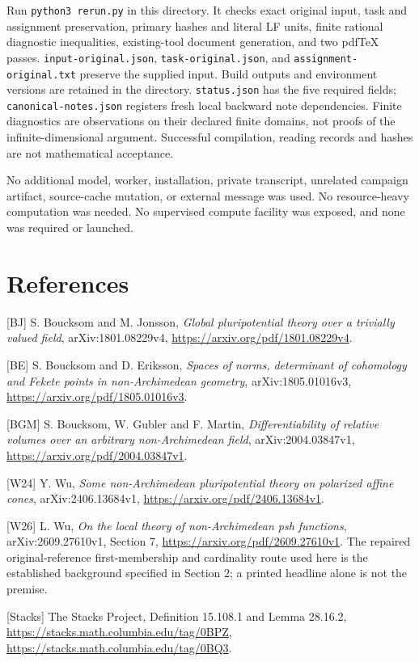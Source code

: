 \documentclass[
  10pt,
]{article}
\begin{document}
Run \texttt{python3\ rerun.py} in this directory. It checks exact
original input, task and assignment preservation, primary hashes and
literal LF units, finite rational diagnostic inequalities, existing-tool
document generation, and two pdfTeX passes.
\texttt{input-original.json}, \texttt{task-original.json}, and
\texttt{assignment-original.txt} preserve the supplied input. Build
outputs and environment versions are retained in the directory.
\texttt{status.json} has the five required fields;
\texttt{canonical-notes.json} registers fresh local backward note
dependencies. Finite diagnostics are observations on their declared
finite domains, not proofs of the infinite-dimensional argument.
Successful compilation, reading records and hashes are not mathematical
acceptance.

No additional model, worker, installation, private transcript, unrelated
campaign artifact, source-cache mutation, or external message was used.
No resource-heavy computation was needed. No supervised compute facility
was exposed, and none was required or launched.

\section{References}\label{references}

{[}BJ{]} S. Boucksom and M. Jonsson, \emph{Global pluripotential theory
over a trivially valued field}, arXiv:1801.08229v4,
\url{https://arxiv.org/pdf/1801.08229v4}.

{[}BE{]} S. Boucksom and D. Eriksson, \emph{Spaces of norms, determinant
of cohomology and Fekete points in non-Archimedean geometry},
arXiv:1805.01016v3, \url{https://arxiv.org/pdf/1805.01016v3}.

{[}BGM{]} S. Boucksom, W. Gubler and F. Martin, \emph{Differentiability
of relative volumes over an arbitrary non-Archimedean field},
arXiv:2004.03847v1, \url{https://arxiv.org/pdf/2004.03847v1}.

{[}W24{]} Y. Wu, \emph{Some non-Archimedean pluripotential theory on
polarized affine cones}, arXiv:2406.13684v1,
\url{https://arxiv.org/pdf/2406.13684v1}.

{[}W26{]} L. Wu, \emph{On the local theory of non-Archimedean psh
functions}, arXiv:2609.27610v1, Section 7,
\url{https://arxiv.org/pdf/2609.27610v1}. The repaired
original-reference first-membership and cardinality route used here is
the established background specified in Section 2; a printed headline
alone is not the premise.

{[}Stacks{]} The Stacks Project, Definition 15.108.1 and Lemma 28.16.2,
\url{https://stacks.math.columbia.edu/tag/0BPZ},
\url{https://stacks.math.columbia.edu/tag/0BQ3}.
\end{document}
